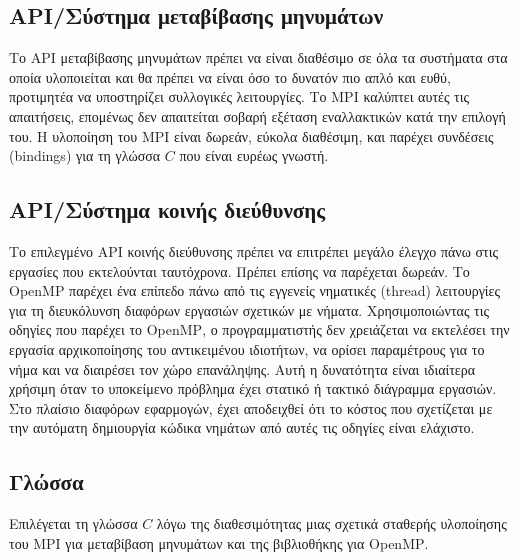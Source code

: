 \documentclass[12pt,a4paper]{article}
\begin{document}
\subsection{\foreignlanguage{english}{API}/Σύστημα μεταβίβασης μηνυμάτων}

Το \foreignlanguage{english}{API} μεταβίβασης μηνυμάτων πρέπει να είναι διαθέσιμο σε όλα τα συστήματα στα οποία
υλοποιείται και θα πρέπει να είναι όσο το δυνατόν πιο απλό και ευθύ, προτιμητέα να
υποστηρίζει συλλογικές λειτουργίες. Το \foreignlanguage{english}{MPI} καλύπτει αυτές τις απαιτήσεις, επομένως δεν απαιτείται σοβαρή εξέταση εναλλακτικών κατά την επιλογή του. Η υλοποίηση του \foreignlanguage{english}{MPI} είναι δωρεάν, εύκολα διαθέσιμη, και παρέχει συνδέσεις (\foreignlanguage{english}{bindings}) για τη γλώσσα $C$ που είναι ευρέως γνωστή.
\vspace{0.2cm}


\subsection{\foreignlanguage{english}{API}/Σύστημα κοινής διεύθυνσης}

Το επιλεγμένο \foreignlanguage{english}{API} κοινής διεύθυνσης πρέπει να επιτρέπει μεγάλο έλεγχο πάνω στις εργασίες
που εκτελούνται ταυτόχρονα. Πρέπει επίσης να παρέχεται δωρεάν. Το \foreignlanguage{english}{OpenMP} παρέχει ένα
επίπεδο πάνω από τις εγγενείς νηματικές (\foreignlanguage{english}{thread}) λειτουργίες για τη διευκόλυνση
διαφόρων εργασιών σχετικών με νήματα. Χρησιμοποιώντας τις οδηγίες που παρέχει το \foreignlanguage{english}{OpenMP},
ο προγραμματιστής δεν χρειάζεται να εκτελέσει την εργασία αρχικοποίησης του αντικειμένου
ιδιοτήτων, να ορίσει παραμέτρους για το νήμα και να διαιρέσει τον χώρο επανάληψης. Αυτή η
δυνατότητα είναι ιδιαίτερα χρήσιμη όταν το υποκείμενο πρόβλημα έχει στατικό ή τακτικό
διάγραμμα εργασιών. Στο πλαίσιο διαφόρων εφαρμογών, έχει αποδειχθεί ότι το κόστος που
σχετίζεται με την αυτόματη δημιουργία κώδικα νημάτων από αυτές τις οδηγίες είναι
ελάχιστο.
\vspace{0.2cm}

\subsection{Γλώσσα}

Επιλέγεται τη γλώσσα $C$ λόγω της διαθεσιμότητας μιας σχετικά σταθερής υλοποίησης του \foreignlanguage{english}{MPI}
για μεταβίβαση μηνυμάτων και της βιβλιοθήκης για \foreignlanguage{english}{OpenMP}.
\vspace{0.2cm}
\end{document}
